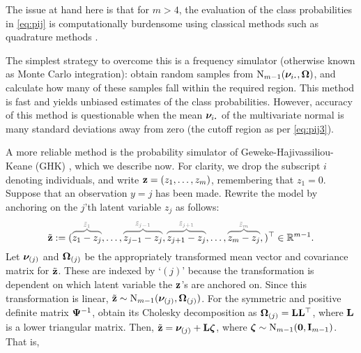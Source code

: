 The issue at hand here is that for $m>4$, the evaluation of the class probabilities in \cref{eq:pij} is computationally burdensome using classical methods such as quadrature methods \citet{geweke1994alternative}.

The simplest strategy to overcome this is a frequency simulator (otherwise known as Monte Carlo integration): obtain random samples from $\N_{m-1}(\bnu_{i\bigcdot}, \bOmega)$, and calculate how many of these samples fall within the required  region.
This method is fast and yields unbiased estimates of the class probabilities.
However, accuracy of this method is questionable when the mean $\bnu_{i\bigcdot}$ of the multivariate normal is many standard deviations away from zero (the cutoff region as per \cref{eq:pij3}).

A more reliable method is the probability simulator of Geweke-Hajivassiliou-Keane (GHK)  \citep{geweke1991efficient,hajivassiliou1996simulation,keane1994computationally}, which we describe now.
For clarity, we drop the subscript $i$ denoting individuals, and write ${\mathbf z} = (z_1,\dots,z_m)$, remembering that $z_1=0$.
Suppose that an observation $y=j$ has been made.
Rewrite the model by anchoring on the $j$'th latent variable $z_{j}$ as follows:
\[
  \tilde\bz := (
  \greyoverbrace{z_1 - z_j}{\tilde z_1},
  \dots,
  \greyoverbrace{z_{j-1} - z_j}{\tilde z_{j-1}},
  \greyoverbrace{z_{j+1} - z_j}{\tilde z_{j+1}},
  \dots, 
  \greyoverbrace{z_m - z_j}{\tilde z_m},
  )^\top \in \bbR^{m-1}.
\]
Let ${\bm\nu}_{(j)}$ and ${\bm\Omega}_{(j)}$ be the appropriately transformed mean vector and covariance matrix for $\tilde {{\mathbf z}}$.
These are indexed by `$(j)$' because the transformation is dependent on which latent variable the ${\mathbf z}$'s are anchored on.
Since this transformation is linear, $\tilde{{\mathbf z}} \sim \operatorname{N}_{m-1}({\bm\nu}_{(j)},{\bm\Omega}_{(j)})$.
For the symmetric and positive definite matrix ${\bm\Psi}^{-1}$, obtain its Cholesky decomposition as ${\bm\Omega}_{(j)} = {\mathbf L}{\mathbf L}^\top$, where ${\mathbf L}$ is a lower triangular matrix.
Then, $\tilde{{\mathbf z}} = {\bm\nu}_{(j)} + {\mathbf L}{\bm\zeta}$, where ${\bm\zeta} \sim\operatorname{N}_{m-1}({\mathbf 0},{\mathbf I}_{m-1})$.
That is,
